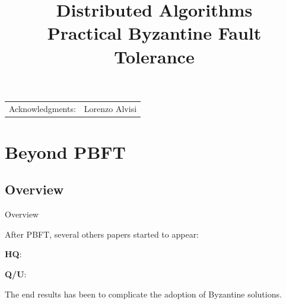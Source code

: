 
\title[DS - BFT]{\textbf{Distributed Algorithms}\\Practical Byzantine Fault Tolerance}

\graphicspath{{figs/17/}}


\newcommand{\Retreat}{\textsc{retreat}}

\newcommand{\Request}{\textsc{request}}
\newcommand{\Preprepare}{\textsc{pre-prepare}}
\newcommand{\Prepare}{\textsc{prepare}}
\newcommand{\Commit}{\textsc{commit}}
\newcommand{\Reply}{\textsc{commit}}
\newcommand{\Checkpoint}{\textsc{checkpoint}}
\newcommand{\ViewChange}{\textsc{view-change}}
\newcommand{\NewView}{\textsc{new-view}}

\newcommand{\Prepared}{\mathbf{prepared}}
\newcommand{\Committed}{\mathbf{committed}}








\begin{FrameTitle}{

\begin{tabular}{P{2.8cm} P{8cm}}
Acknowledgments: & Lorenzo Alvisi\\
\end{tabular}
}

\end{FrameTitle}


\FrameContent


\section{Beyond PBFT}

\subsection{Overview}

\begin{frame}{Overview}
	
After PBFT, several others papers started to appear:
\BIL
\item \textbf{HQ}: 
\item \textbf{Q/U}: 
\EIL

The end results has been to complicate the adoption of Byzantine solutions.

\end{frame}

